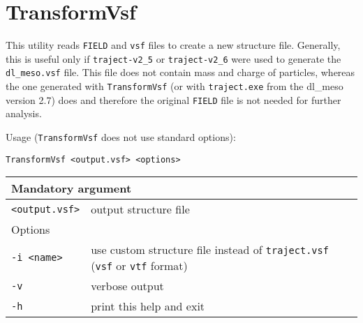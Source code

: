 \section{TransformVsf} \label{sec:TransformVsf}

This utility reads \texttt{FIELD} and \texttt{vsf} files to create a new
structure file. Generally, this is useful only if \texttt{traject-v2\_5} or
\texttt{traject-v2\_6} were used to generate the \texttt{dl\_meso.vsf}
file. This file does not contain mass and charge of particles, whereas the
one generated with \texttt{TransformVsf} (or with \texttt{traject.exe} from
the dl\_meso version 2.7) does and therefore the original \texttt{FIELD}
file is not needed for further analysis.

Usage (\texttt{TransformVsf} does not use standard options):

\vspace{1em}
\noindent
\texttt{TransformVsf <output.vsf> <options>}

\vspace{1em}
\noindent
\begin{longtable}{p{}p{}}
  \toprule
  \multicolumn{2}{l}{Mandatory argument} \\
  \midrule
  \texttt{<output.vsf>} & output structure file \\
  \multicolumn{2}{l}{Options} \\
  \texttt{-i <name>} & use custom structure file instead of
    \texttt{traject.vsf} (\texttt{vsf} or \texttt{vtf} format) \\
  \texttt{-v} & verbose output \\
  \texttt{-h} & print this help and exit \\
  \bottomrule
\end{longtable}
